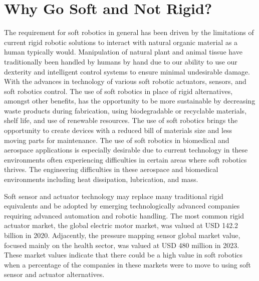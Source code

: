 \section{Why Go Soft and Not Rigid?}
The requirement for soft robotics in general has been driven by the limitations of current rigid robotic solutions to interact with natural organic material as a human typically would. Manipulation of natural plant and animal tissue have traditionally been handled by humans by hand due to our ability to use our dexterity and intelligent control systems to ensure minimal undesirable damage. With the advances in technology of various soft robotic actuators\cite{Stella2023,Zhang2023,Hartmann2021,Yasa2023, Manti2016}, sensors\cite{Hegde2023}, and soft robotics control\cite{DellaSantina2023, Armanini2023}. The use of soft robotics in place of rigid alternatives, amongst other benefits, has the opportunity to be more sustainable by decreasing waste products during fabrication, using biodegradable or recyclable materials, shelf life, and use of renewable resources\cite{Hartmann2021}. The use of soft robotics brings the opportunity to create devices with a reduced bill of materials size and less moving parts for maintenance. The use of soft robotics in biomedical and aerospace applications is especially desirable due to current technology in these environments often experiencing difficulties in certain areas where soft robotics thrives. The engineering difficulties in these aerospace and biomedical environments including heat dissipation, lubrication, and mass\cite{Murugesan1981,Ashuri2020,Branz2017,Bruschi2021}. 

Soft sensor and actuator technology may replace many traditional rigid equivalents and be adopted by emerging technologically advanced companies requiring advanced automation and robotic handling. The most common rigid actuator market, the global electric motor market, was valued at USD 142.2 billion in 2020\cite{alliedmarketresearch}. Adjacently, the pressure mapping sensor global market value, focused mainly on the health sector, was valued at USD 480 million in 2023\cite{Bharatha2023}. These market values indicate that there could be a high value in soft robotics when a percentage of the companies in these markets were to move to using soft sensor and actuator alternatives.


